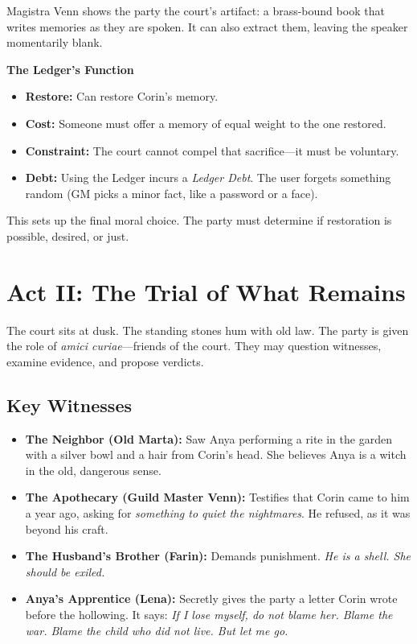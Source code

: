 \documentclass[12pt]{book}
\begin{document}
Magistra Venn shows the party the court's artifact: a brass-bound book that writes memories as they are spoken. It can also extract them, leaving the speaker momentarily blank.

\begin{infobox}
\textbf{The Ledger's Function}
\begin{itemize}
    \item \textbf{Restore:} Can restore Corin's memory.
    \item \textbf{Cost:} Someone must offer a memory of equal weight to the one restored.
    \item \textbf{Constraint:} The court cannot compel that sacrifice---it must be voluntary.
    \item \textbf{Debt:} Using the Ledger incurs a \textit{Ledger Debt}. The user forgets something random (GM picks a minor fact, like a password or a face).
\end{itemize}
\end{infobox}

This sets up the final moral choice. The party must determine if restoration is possible, desired, or just.

\chapter{Act II: The Trial of What Remains}

The court sits at dusk. The standing stones hum with old law. The party is given the role of \textit{amici curiae}---friends of the court. They may question witnesses, examine evidence, and propose verdicts.

\section{Key Witnesses}

\begin{itemize}
    \item \textbf{The Neighbor (Old Marta):} Saw Anya performing a rite in the garden with a silver bowl and a hair from Corin's head. She believes Anya is a witch in the old, dangerous sense.
    \item \textbf{The Apothecary (Guild Master Venn):} Testifies that Corin came to him a year ago, asking for \textit{something to quiet the nightmares}. He refused, as it was beyond his craft.
    \item \textbf{The Husband's Brother (Farin):} Demands punishment. \textit{He is a shell. She should be exiled.}
    \item \textbf{Anya's Apprentice (Lena):} Secretly gives the party a letter Corin wrote before the hollowing. It says: \textit{If I lose myself, do not blame her. Blame the war. Blame the child who did not live. But let me go.}
\end{itemize}
\end{document}
